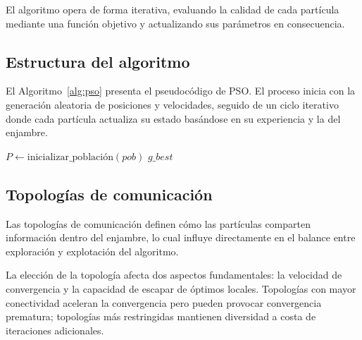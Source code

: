 \documentclass[12pt]{article}
\begin{document}
El algoritmo opera de forma iterativa, evaluando la calidad de cada
partícula mediante una función objetivo y actualizando sus parámetros
en consecuencia.

\subsection{Estructura del algoritmo}

El Algoritmo~\ref{alg:pso} presenta el pseudocódigo de PSO. El
proceso inicia con la generación aleatoria de posiciones y
velocidades, seguido de un ciclo iterativo donde cada partícula
actualiza su estado basándose en su experiencia y la del enjambre.

\begin{algorithm}[H]
  \caption{PSO$(pob, c_1, c_2)$}
  \label{alg:pso}
  $P \gets \text{inicializar\_población}(pob)$\;
  \Regresar $g\_best$\;
\end{algorithm}

\subsection{Topologías de comunicación}

Las topologías de comunicación definen cómo las partículas comparten
información dentro del enjambre, lo cual influye directamente en el
balance entre exploración y explotación del algoritmo.

La elección de la topología afecta dos aspectos fundamentales: la
velocidad de convergencia y la capacidad de escapar de óptimos
locales. Topologías con mayor conectividad aceleran la convergencia
pero pueden provocar convergencia prematura; topologías más
restringidas mantienen diversidad a costa de iteraciones adicionales.
\end{document}

